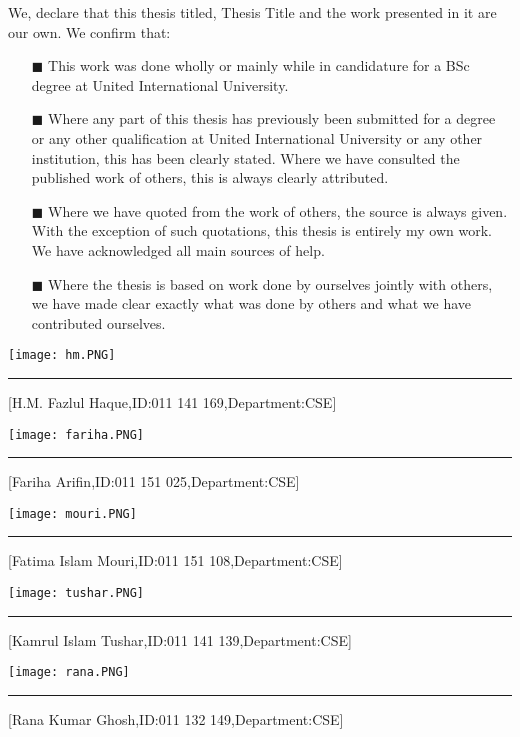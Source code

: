 \begin{declaration} 
We, declare that this thesis titled, Thesis Title and the work presented in it are our own. We confirm that:
\begin{itemize} 
\item[\tiny{$\blacksquare$}] This work was done wholly or mainly while in candidature for a BSc degree at United International University.
\item[\tiny{$\blacksquare$}] Where any part of this thesis has previously been submitted for a degree or any other qualification at United International University or any other institution, this has been clearly stated. Where we have consulted the published work of others, this is always clearly attributed.
\item[\tiny{$\blacksquare$}] Where we have quoted from the work of others, the source is always given. With the exception of such quotations, this thesis is entirely my own work. We have acknowledged all main sources of help.
\item[\tiny{$\blacksquare$}] Where the thesis is based on work done by ourselves jointly with others, we have made clear exactly what was done by others and what we have contributed ourselves.
\end{itemize}
\begin{minipage}[b]{0.4\textwidth}
    \texttt{[image: hm.PNG]}
    \rule{1.6\textwidth}{.4pt}
  \end{minipage}

[H.M. Fazlul Haque,ID:011 141 169,Department:CSE]

\begin{minipage}[b]{0.4\textwidth}
    \texttt{[image: fariha.PNG]}
    \rule{1.6\textwidth}{.4pt}
  \end{minipage}

[Fariha Arifin,ID:011 151 025,Department:CSE]

\begin{minipage}[b]{0.4\textwidth}
    \texttt{[image: mouri.PNG]}
    \rule{1.6\textwidth}{.4pt}
  \end{minipage}

[Fatima Islam Mouri,ID:011 151 108,Department:CSE]

\begin{minipage}[b]{0.4\textwidth}
    \texttt{[image: tushar.PNG]}
    \rule{1.6\textwidth}{.4pt}
  \end{minipage}

[Kamrul Islam Tushar,ID:011 141 139,Department:CSE]

\begin{minipage}[b]{0.4\textwidth}
    \texttt{[image: rana.PNG]}
    \rule{1.6\textwidth}{.4pt}
  \end{minipage}

[Rana Kumar Ghosh,ID:011 132 149,Department:CSE]





\end{declaration}
